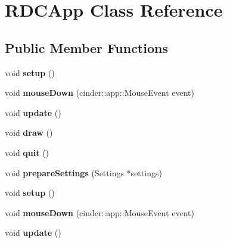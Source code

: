 \hypertarget{class_r_d_c_app}{\section{R\-D\-C\-App Class Reference}
\label{class_r_d_c_app}
}
\subsection*{Public Member Functions}
\begin{DoxyCompactItemize}
\item 
\hypertarget{class_r_d_c_app_a2beba15c6e8e8e6f6201a8a50d8da0f4}{void {\bfseries setup} ()}\label{class_r_d_c_app_a2beba15c6e8e8e6f6201a8a50d8da0f4}

\item 
\hypertarget{class_r_d_c_app_aaaa5b21bfaa4718548670da8ef85874a}{void {\bfseries mouse\-Down} (cinder\-::app\-::\-Mouse\-Event event)}\label{class_r_d_c_app_aaaa5b21bfaa4718548670da8ef85874a}

\item 
\hypertarget{class_r_d_c_app_a723f728fbaa75cf513d4a592ebba124f}{void {\bfseries update} ()}\label{class_r_d_c_app_a723f728fbaa75cf513d4a592ebba124f}

\item 
\hypertarget{class_r_d_c_app_ae9e4cc30d7dd25d5fc65d712e64d722f}{void {\bfseries draw} ()}\label{class_r_d_c_app_ae9e4cc30d7dd25d5fc65d712e64d722f}

\item 
\hypertarget{class_r_d_c_app_ab24352d72c0e773c6edd629584270c8e}{void {\bfseries quit} ()}\label{class_r_d_c_app_ab24352d72c0e773c6edd629584270c8e}

\item 
\hypertarget{class_r_d_c_app_a03237f9900e117ee9cf6fade74b3ada1}{void {\bfseries prepare\-Settings} (Settings $\ast$settings)}\label{class_r_d_c_app_a03237f9900e117ee9cf6fade74b3ada1}

\item 
\hypertarget{class_r_d_c_app_a2beba15c6e8e8e6f6201a8a50d8da0f4}{void {\bfseries setup} ()}\label{class_r_d_c_app_a2beba15c6e8e8e6f6201a8a50d8da0f4}

\item 
\hypertarget{class_r_d_c_app_aaaa5b21bfaa4718548670da8ef85874a}{void {\bfseries mouse\-Down} (cinder\-::app\-::\-Mouse\-Event event)}\label{class_r_d_c_app_aaaa5b21bfaa4718548670da8ef85874a}

\item 
\hypertarget{class_r_d_c_app_a723f728fbaa75cf513d4a592ebba124f}{void {\bfseries update} ()}\label{class_r_d_c_app_a723f728fbaa75cf513d4a592ebba124f}


\end{DoxyCompactItemize}
